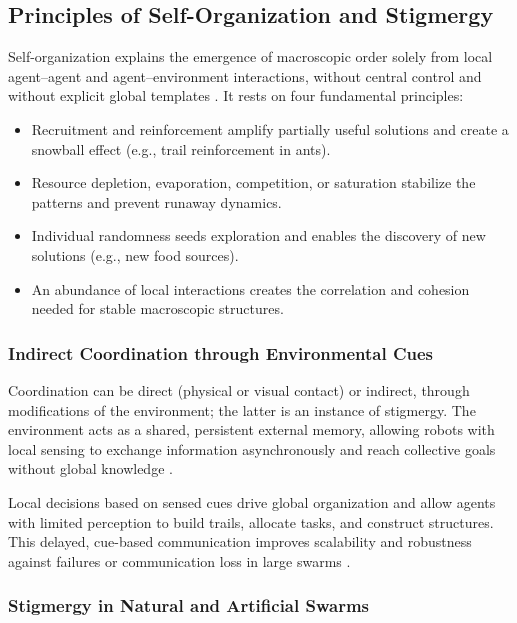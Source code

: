 \subsection{Principles of Self-Organization and Stigmergy}

Self-organization explains the emergence of macroscopic order solely from local
agent--agent and agent--environment interactions, without central control and
without explicit global templates \cite{bonabeau1999swarm,garnier2007biological}. It rests on four fundamental
principles:
\begin{itemize}
  \item {} Recruitment and reinforcement amplify partially
        useful solutions and create a snowball effect (e.g., trail reinforcement
        in ants).
  \item {} Resource depletion, evaporation, competition, or
        saturation stabilize the patterns and prevent runaway dynamics.
  \item {} Individual randomness seeds
        exploration and enables the discovery of new solutions (e.g., new food
        sources).
  \item {} An abundance of local interactions creates
        the correlation and cohesion needed for stable macroscopic structures.
\end{itemize}

\subsubsection{Indirect Coordination through Environmental Cues}

Coordination can be direct (physical or visual contact) or indirect, through
modifications of the environment; the latter is an instance of stigmergy. The
environment acts as a shared, persistent external memory, allowing robots with
local sensing to exchange information asynchronously and reach collective goals
without global knowledge \cite{bonabeau1999swarm,garnier2007biological}.

Local decisions based on sensed cues drive global organization and allow agents
with limited perception to build trails, allocate tasks, and construct
structures. This delayed, cue-based communication improves scalability and
robustness against failures or communication loss in large swarms \cite{bonabeau1999swarm,garnier2007biological}.

\subsubsection{Stigmergy in Natural and Artificial Swarms}

